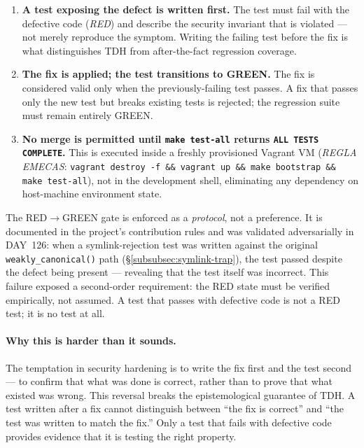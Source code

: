 \documentclass[11pt,a4paper]{article}
\begin{document}
    \begin{enumerate}
        \item \textbf{A test exposing the defect is written first.}
        The test must fail with the defective code (\emph{RED}) and describe
        the security invariant that is violated --- not merely reproduce the
        symptom. Writing the failing test before the fix is what distinguishes
        TDH from after-the-fact regression coverage.

        \item \textbf{The fix is applied; the test transitions to GREEN.}
        The fix is considered valid only when the previously-failing test passes.
        A fix that passes only the new test but breaks existing tests is rejected;
        the regression suite must remain entirely GREEN.

        \item \textbf{No merge is permitted until \texttt{make test-all} returns
        \texttt{ALL TESTS COMPLETE}.}
        This is executed inside a freshly provisioned Vagrant VM
        (\emph{REGLA EMECAS}: \texttt{vagrant destroy -f \&\& vagrant up \&\&
        make bootstrap \&\& make test-all}), not in the development shell,
        eliminating any dependency on host-machine environment state.
    \end{enumerate}

    The RED$\to$GREEN gate is enforced as a \emph{protocol}, not a preference.
    It is documented in the project's contribution rules and was validated
    adversarially in DAY~126: when a symlink-rejection test was written against
    the original \texttt{weakly\_canonical()} path
    (\S\ref{subsubsec:symlink-trap}), the test passed despite the defect being
    present --- revealing that the test itself was incorrect. This failure exposed
    a second-order requirement: the RED state must be verified empirically, not
    assumed. A test that passes with defective code is not a RED test; it is no
    test at all.

    \paragraph{Why this is harder than it sounds.}
    The temptation in security hardening is to write the fix first and the test
    second --- to confirm that what was done is correct, rather than to prove that
    what existed was wrong. This reversal breaks the epistemological guarantee of
    TDH. A test written after a fix cannot distinguish between ``the fix is correct''
    and ``the test was written to match the fix.'' Only a test that fails with
    defective code provides evidence that it is testing the right property.
\end{document}
